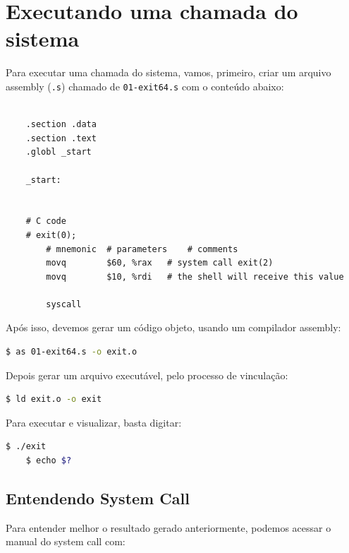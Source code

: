 \hypertarget{executando-uma-chamada-do-sistema}{%
\section{Executando uma chamada do
sistema}\label{executando-uma-chamada-do-sistema}}

Para executar uma chamada do sistema, vamos, primeiro, criar um arquivo
assembly (\texttt{.s}) chamado de \texttt{01-exit64.s} com o conteúdo
abaixo:

\begin{verbatim}
    
    .section .data
    .section .text
    .globl _start
    
    _start:
    
    
    # C code
    # exit(0);
        # mnemonic  # parameters    # comments
        movq        $60, %rax   # system call exit(2)
        movq        $10, %rdi   # the shell will receive this value
    
        syscall
\end{verbatim}



Após isso, devemos gerar um código objeto, usando um compilador assembly:

\begin{lstlisting}[language=bash]
    $ as 01-exit64.s -o exit.o
\end{lstlisting}



Depois gerar um arquivo executável, pelo processo de vinculação:


\begin{lstlisting}[language=bash]
    $ ld exit.o -o exit
\end{lstlisting}


Para executar e visualizar, basta digitar:


\begin{lstlisting}[language=bash]
    $ ./exit
    $ echo $?
\end{lstlisting}



\hypertarget{entendendo-system-call}{%
\subsection{Entendendo System Call}\label{entendendo-system-call}}

Para entender melhor o resultado gerado anteriormente, podemos acessar o
manual do system call com:


